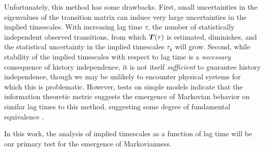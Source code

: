 Unfortunately, this method has some drawbacks.  
First, small uncertainties in the eigenvalues of the transition matrix can induce very large uncertainties in the implied timescales.  
With increasing lag time $\tau$, the number of statistically independent observed transitions, from which ${\mbox{\boldmath{$T$}}}(\tau)$ is estimated, diminishes, and the statistical uncertainty in the implied timescales $\tau_k$ will grow.
Second, while stability of the implied timescales with respect to lag time is a \emph{necessary} consequence of history independence, it is not itself \emph{sufficient} to guarantee history independence, though we may be unlikely to encounter physical systems for which this is problematic.
However, tests on simple models indicate that the information theoretic metric suggests the emergence of Markovian behavior on similar lag times to this method, suggesting some degree of fundamental equivalence \cite{park:2006a}.

In this work, the analysis of implied timescales as a function of lag time will be our primary test for the emergence of Markovianness.


